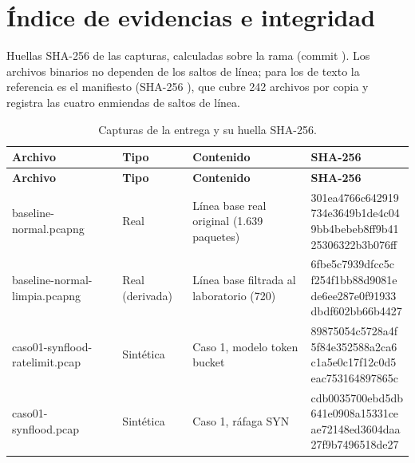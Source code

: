 \chapter{Índice de evidencias e integridad}
Huellas SHA-256 de las capturas, calculadas sobre la rama  (commit ). Los archivos binarios no dependen de los saltos de línea; para los de texto la referencia es el manifiesto  (SHA-256 ), que cubre 242 archivos por copia y registra las cuatro enmiendas de saltos de línea.

{\small\renewcommand{\arraystretch}{1.2}
\begin{longtable}{@{}p{4.6cm}p{2cm}p{4.4cm}p{2.9cm}@{}}
\caption{Capturas de la entrega y su huella SHA-256.}\\\toprule
\textbf{Archivo} & \textbf{Tipo} & \textbf{Contenido} & \textbf{SHA-256}\\\midrule\endfirsthead
\toprule\textbf{Archivo} & \textbf{Tipo} & \textbf{Contenido} & \textbf{SHA-256}\\\midrule\endhead
{\ttfamily\scriptsize baseline-normal.pcapng} & Real & Línea base real original (1.639 paquetes) & \cod{\scriptsize 301ea4766c642919\newline 734e3649b1de4c04\newline 9bb4bebeb8ff9b41\newline 25306322b3b076ff}\\
{\ttfamily\scriptsize baseline-normal-limpia.pcapng} & Real (derivada) & Línea base filtrada al laboratorio (720) & \cod{\scriptsize 6fbe5c7939dfcc5c\newline f254f1bb88d9081e\newline de6ee287e0f91933\newline dbdf602bb66b4427}\\
{\ttfamily\scriptsize caso01-synflood-ratelimit.pcap} & Sintética & Caso 1, modelo token bucket & \cod{\scriptsize 89875054c5728a4f\newline 5f84e352588a2ca6\newline c1a5e0c17f12c0d5\newline eac753164897865c}\\
{\ttfamily\scriptsize caso01-synflood.pcap} & Sintética & Caso 1, ráfaga SYN & \cod{\scriptsize cdb0035700ebd5db\newline 641e0908a15331ce\newline ae72148ed3604daa\newline 27f9b7496518de27}\\

\end{longtable}}
